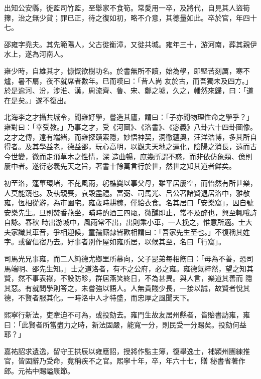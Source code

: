 \begin{pinyinscope}
 出知公安縣，徙監司竹監，至舉家不食筍。常愛用一卒，及將代，自見其人盜筍籜，治之無少貸；罪已正，待之復如初，略不介意，其德量如此。卒於官，年四十七。



 邵雍字堯夫。其先範陽人，父古徙衡漳，又徙共城。雍年三十，游河南，葬其親伊水上，遂為河南人。



 雍少時，自雄其才，慷慨欲樹功名。於書無所不讀，始為學，即堅苦刻厲，寒不爐，暑不扇，夜不就席者數年。已而嘆曰：「昔人尚
 友於古，而吾獨未及四方。」於是逾河、汾，涉淮、漢，周流齊、魯、宋、鄭之墟，久之，幡然來歸，曰：「道在是矣。」遂不復出。



 北海李之才攝共城令，聞雍好學，嘗造其廬，謂曰：「子亦聞物理性命之學乎？」雍對曰：「幸受教。」乃事之才，受《河圖》、《洛書》、《宓義》八卦六十四卦圖像。之才之傳，遠有端緒，而雍探賾索隱，妙悟神契，洞徹蘊奧，汪洋浩博，多其所自得者。及其學益老，德益邵，玩心高明，以觀夫天地之運化，陰陽之消長，遠而古今世變，微而走飛草木之性情，深
 造曲暢，庶幾所謂不惑，而非依仿象類、億則屢中者。遂衍宓羲先天之旨，著書十餘萬言行於世，然世之知其道者鮮矣。



 初至洛，蓬蓽環堵，不芘風雨，躬樵爨以事父母，雖平居屢空，而怡然有所甚樂，人莫能窺也。及執親喪，哀毀盡禮。富弼、司馬光、呂公著諸賢退居洛中，雅敬雍，恆相從游，為市園宅。雍歲時耕稼，僅給衣食。名其居曰「安樂窩」，因自號安樂先生。旦則焚香燕坐，晡時酌酒三四甌，微醺即止，常不及醉也，興至輒哦詩自詠。春秋
 時出游城中，風雨常不出，出則乘小車，一人挽之，惟意所適。士大夫家識其車音，爭相迎候，童孺廝隸皆歡相謂曰：「吾家先生至也。」不復稱其姓字。或留信宿乃去。好事者別作屋如雍所居，以候其至，名曰「行窩」。



 司馬光兄事雍，而二人純德尤鄉里所慕向，父子昆弟每相飭曰：「毋為不善，恐司馬端明、邵先生知。」士之道洛者，有不之公府，必之雍。雍德氣粹然，望之知其賢，然不事表襮，不設防畛，群居燕笑終日，不為甚異。與人言，樂道其善而
 隱其惡。有就問學則答之，未嘗強以語人。人無貴賤少長，一接以誠，故賢者悅其德，不賢者服其化。一時洛中人才特盛，而忠厚之風聞天下。



 熙寧行新法，吏牽迫不可為，或投劾去。雍門生故友居州縣者，皆貽書訪雍，雍曰：「此賢者所當盡力之時，新法固嚴，能寬一分，則民受一分賜矣。投劾何益耶？」



 嘉祐詔求遺逸，留守王拱辰以雍應詔，授將作監主簿，復舉逸士，補潁州團練推官，皆固辭乃受命，竟稱疾不之官。熙寧十年，卒，年六十七，贈
 秘書省著作郎。元祐中賜謚康節。




\end{pinyinscope}
